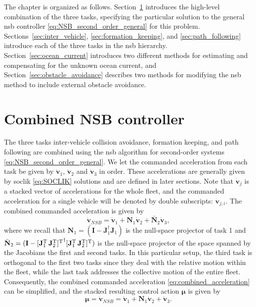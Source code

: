 The chapter is organized as follows. Section~\ref{sec:combined_NSB} introduces the high-level combination of the three tasks, specifying the particular solution to the general \gls{nsb} controller \eqref{eq:NSB_second_order_general} for this problem. Sections~\ref{sec:inter_vehicle}, \ref{sec:formation_keeping}, and \ref{sec:path_following} introduce each of the three tasks in the \gls{nsb} hierarchy. Section~\ref{sec:ocean_current} introduces two different methods for estimating and compensating for the unknown ocean current, and Section~\ref{sec:obstacle_avoidance} describes two methods for modifying the \gls{nsb} method to include external obstacle avoidance.

\section{Combined NSB controller}\label{sec:combined_NSB}
The three tasks inter-vehicle collision avoidance, formation keeping, and path following are combined using the \gls{nsb} algorithm for second-order systems \eqref{eq:NSB_second_order_general}. We let the commanded acceleration from each task be given by $\dot{\mathbf{v}}_1$, $\dot{\mathbf{v}}_2$ and $\dot{\mathbf{v}}_3$ in order. These accelerations are generally given by \gls{soclik} \eqref{eq:SOCLIK} solutions and are defined in later sections. Note that $\dot{\mathbf{v}}_j$ is a stacked vector of accelerations for the whole fleet, and the commanded acceleration for a single vehicle will be denoted by double subscripts: $\dot{\mathbf{v}}_{j,i}$. The combined commanded acceleration is given by
\begin{equation}\label{eq:combined_acceleration}
    \dot{\mathbf{v}}_{NSB} = \dot{\mathbf{v}}_1 + \mathbf{N}_1 \dot{\mathbf{v}}_2 + \bar{\mathbf{N}}_2 \dot{\mathbf{v}}_3,
\end{equation}
where we recall that $\mathbf{N}_1 = (\mathbf{I} - \mathbf{J}_1^\dagger \mathbf{J}_1)$ is the null-space projector of task 1 and $\bar{\mathbf{N}}_2 = (\mathbf{I} - {[\mathbf{J}_1^{\rm T} \, \mathbf{J}_2^{\rm T}]^{\rm T}}^\dagger [\mathbf{J}_1^{\rm T} \, \mathbf{J}_2^{\rm T}]^{\rm T})$ is the null-space projector of the space spanned by the Jacobians the first and second tasks. In this particular setup, the third task is orthogonal to the first two tasks since they deal with the relative motion within the fleet, while the last task addresses the collective motion of the entire fleet. Consequently, the combined commanded acceleration \eqref{eq:combined_acceleration} can be simplified, and the stacked resulting control action $\bm{\mu}$ is given by
\begin{equation}\label{eq:combined_control_action}
    \bm{\mu} = \dot{\mathbf{v}}_{NSB} = \dot{\mathbf{v}}_1 + \mathbf{N}_1 \dot{\mathbf{v}}_2 + \dot{\mathbf{v}}_3.
\end{equation}

